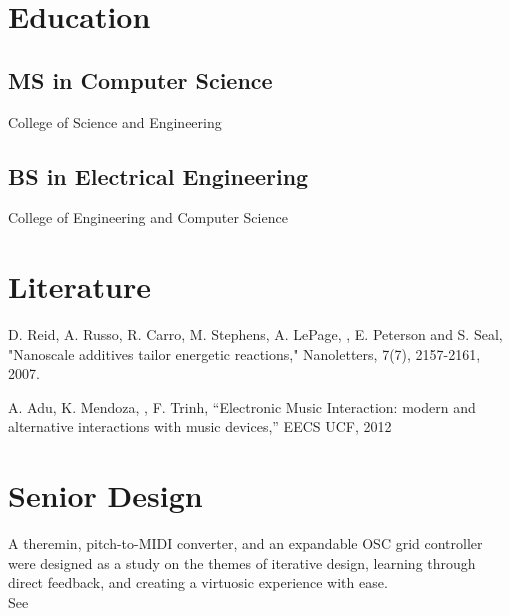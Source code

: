 \documentclass[]{resume-openfont}
\begin{document}
\lastupdated
{}

\begin{minipage}[t]{0.34\textwidth}
\section{Education}
\subsection{MS in Computer Science}
College of Science and Engineering
\sectionsep

\subsection{BS in Electrical Engineering}
College of Engineering and Computer Science
\sectionsep

\section{Literature}
\textbullet{} D. Reid, A. Russo, R. Carro, M. Stephens, A. LePage, , E. Peterson and S. Seal, "Nanoscale additives tailor energetic reactions," Nanoletters, 7(7), 2157-2161, 2007.

\textbullet{} A. Adu, K. Mendoza, , F. Trinh, “Electronic Music Interaction: modern and alternative interactions with music  devices,” EECS UCF, 2012
\sectionsep

\section{Senior Design}
A theremin, pitch-to-MIDI converter, and an expandable OSC grid controller were designed as a study on the themes of iterative design, learning through direct feedback, and creating a virtuosic experience with ease. \\
See \href{http://eecs.ucf.edu/seniordesign/su2012fa2012/g01}{}


\end{minipage}
\end{document}

